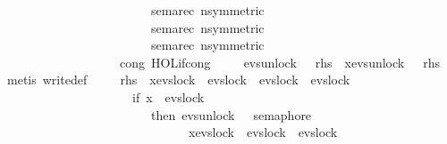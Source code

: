 \begin{isabellebody}
\ \ \ \ \ \ \ \ \ \ \ \ \ \ \ \ \ \ \ \ \ \ \ \ sema{\isacharunderscore}{\kern0pt}rec{\isacharbrackleft}{\kern0pt}\ n{\isacharequal}{\kern0pt}{\isacartoucheopen}{}{\isacartoucheclose}{\isacharcomma}{\kern0pt}symmetric{\isacharbrackright}{\kern0pt}\ \isanewline
\ \ \ \ \ \ \ \ \ \ \ \ \ \ \ \ \ \ \ \ \ \ \ \ sema{\isacharunderscore}{\kern0pt}rec{\isacharbrackleft}{\kern0pt}\ n{\isacharequal}{\kern0pt}{\isacartoucheopen}{}{\isacartoucheclose}{\isacharcomma}{\kern0pt}symmetric{\isacharbrackright}{\kern0pt}\ \isanewline
\ \ \ \ \ \ \ \ \ \ \ \ \ \ \ \ \ \ \ \ \ \ \ \ sema{\isacharunderscore}{\kern0pt}rec{\isacharbrackleft}{\kern0pt}\ n{\isacharequal}{\kern0pt}{\isacartoucheopen}{}{\isacartoucheclose}{\isacharcomma}{\kern0pt}symmetric{\isacharbrackright}{\kern0pt}\ \isanewline
\ \ \ \ \ \ \ \ \ \ \ \ \ \ \ \ \ \ \ cong{\isacharcolon}{\kern0pt}\ HOL{\isachardot}{\kern0pt}if{\isacharunderscore}{\kern0pt}cong{\isacharparenright}{\kern0pt}\isanewline
\ \ \isamarkupfalse%
\ {}{\isacharcolon}{\kern0pt}\ {\isachardoublequoteopen}evs{\isachardot}{\kern0pt}unlock\ {}\ {\isasymrightarrow}\ {\isacharquery}{\kern0pt}rhs\ {\isacharequal}{\kern0pt}\ {\isasymbox}x{\isasymin}{\isacharbraceleft}{\kern0pt}evs{\isachardot}{\kern0pt}unlock\ {}{\isacharbraceright}{\kern0pt}\ {\isasymrightarrow}\ {\isacharquery}{\kern0pt}rhs{\isachardoublequoteclose}\ \isamarkupfalse%
\ {\isacharparenleft}{\kern0pt}metis\ write{}{\isacharunderscore}{\kern0pt}def{\isacharparenright}{\kern0pt}\isanewline
\ \ \isamarkupfalse%
\ {}{\isacharcolon}{\kern0pt}\ {\isachardoublequoteopen}{\isacharquery}{\kern0pt}rhs\ {\isacharequal}{\kern0pt}\ {\isasymbox}x{\isasymin}{\isacharbraceleft}{\kern0pt}evs{\isachardot}{\kern0pt}lock\ {}{\isacharcomma}{\kern0pt}\ evs{\isachardot}{\kern0pt}lock\ {}{\isacharcomma}{\kern0pt}\ evs{\isachardot}{\kern0pt}lock\ {}{\isacharcomma}{\kern0pt}\ evs{\isachardot}{\kern0pt}lock\ {}{\isacharbraceright}{\kern0pt}\isanewline
\ \ \ \ \ \ \ \ \ \ \ \ \ \ \ \ \ \ \ \ {\isasymrightarrow}\ {\isacharparenleft}{\kern0pt}if\ x\ {\isacharequal}{\kern0pt}\ evs{\isachardot}{\kern0pt}lock\ {}\isanewline
\ \ \ \ \ \ \ \ \ \ \ \ \ \ \ \ \ \ \ \ \ \ \ \ then\ evs{\isachardot}{\kern0pt}unlock\ {}\ {\isasymrightarrow}\ semaphore\ \ {}\ \isanewline
\ \ \ \ \ \ \ \ \ \ \ \ \ \ \ \ \ \ \ \ \ \ \ \ \ \ \ \ \ {\isacharbar}{\kern0pt}{\isacharbar}{\kern0pt}{\isacharbar}{\kern0pt}\ {\isasymbox}x{\isasymin}{\isacharbraceleft}{\kern0pt}evs{\isachardot}{\kern0pt}lock\ {}{\isacharcomma}{\kern0pt}\ evs{\isachardot}{\kern0pt}lock\ {}{\isacharcomma}{\kern0pt}\ evs{\isachardot}{\kern0pt}lock\ {}{\isacharbraceright}{\kern0pt}\isanewline

\end{isabellebody}
